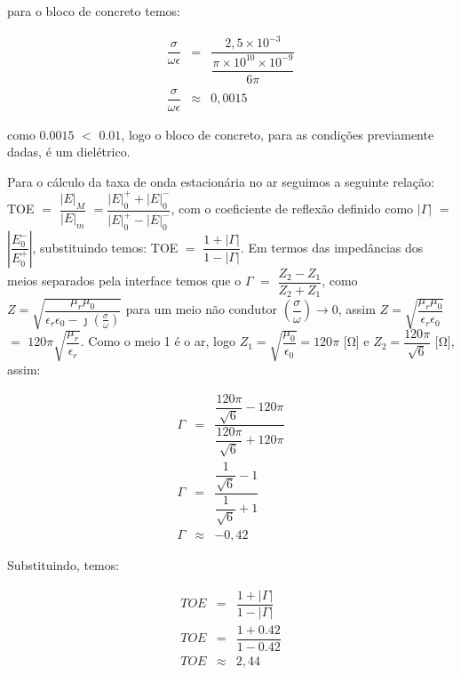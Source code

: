 \begin{enumerate}[1.]
para o bloco de concreto temos:

\begin{eqnarray*}
  \dfrac{\sigma}{\omega \epsilon} & = & \dfrac{2,5 \times 10^{-3}}{\dfrac{\pi \times 10^{10} \times 10^{-9}}{6\pi}} \nonumber \\
  \dfrac{\sigma}{\omega \epsilon} & \approx & 0,0015 \nonumber
\end{eqnarray*}

como $0.0015$ $<$ $0.01$, logo o bloco de concreto, para as condições previamente dadas, é um dielétrico.

Para o cálculo da taxa de onda estacionária no ar seguimos a seguinte relação: TOE $=$ $\dfrac{|E|_{M}}{|E|_{m}}$ $=$$\dfrac{|E|^{+}_{0} + |E|^{-}_{0}}{|E|^{+}_{0} - |E|^{-}_{0}}$, com o coeficiente de reflexão definido como $|\Gamma|$ $=$ $\left|\dfrac{E^{-}_{0}}{E^{+}_{0}}\right|$, substituindo temos: TOE $=$ $\dfrac{1 + |\Gamma|}{1 - |\Gamma|}$. Em termos das impedâncias dos meios separados pela interface temos que o $\Gamma$ $=$ $\dfrac{Z_{2} - Z_{1}}{Z_{2} + Z_{1}}$, como $Z = \sqrt{\dfrac{\mu_{r}\mu_{0}}{\epsilon_{r}\epsilon_{0} - \jmath \left(\frac{\sigma}{\omega}\right)}}$  para um meio não condutor $\left(\dfrac{\sigma}{\omega}\right) \rightarrow 0$, assim $Z = \sqrt{\dfrac{\mu_{r}\mu_{0}}{\epsilon_{r}\epsilon_{0}}}$ $=$ $120\pi \sqrt{\dfrac{\mu_{r}}{\epsilon_{r}}}$.  Como o meio 1 é o ar, logo $Z_{1} = \sqrt{\dfrac{\mu_{0}}{\epsilon_{0}}} =120\pi$ [\si{\ohm}] e $Z_{2} = \dfrac{120\pi}{\sqrt{6}}$ [\si{\ohm}], assim:

\begin{eqnarray*}
  \Gamma & = & \dfrac{\dfrac{120\pi}{\sqrt{6}} - 120\pi}{\dfrac{120\pi}{\sqrt{6}} + 120\pi} \nonumber \\
  \Gamma & = &\dfrac{\dfrac{1}{\sqrt{6}} - 1}{\dfrac{1}{\sqrt{6}} + 1} \nonumber \\
  \Gamma & \approx & -0,42 \nonumber
\end{eqnarray*}

Substituindo, temos:

\begin{eqnarray*}
  TOE & = & \dfrac{1 + |\Gamma|}{1 - |\Gamma|} \nonumber \\
  TOE & = & \dfrac{1 + 0.42}{1 - 0.42} \nonumber \\
  TOE & \approx & 2,44
\end{eqnarray*}


\end{enumerate}
